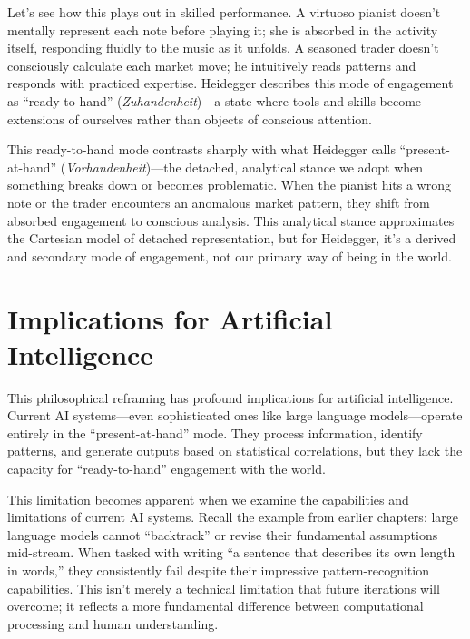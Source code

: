 \documentclass[
  Letterpaper,
]{scrbook}
\begin{document}
Let's see how this plays out in skilled performance. A virtuoso pianist
doesn't mentally represent each note before playing it; she is absorbed
in the activity itself, responding fluidly to the music as it unfolds. A
seasoned trader doesn't consciously calculate each market move; he
intuitively reads patterns and responds with practiced expertise.
Heidegger describes this mode of engagement as
``ready-to-hand''
(\emph{Zuhandenheit})---a state where tools and skills become extensions
of ourselves rather than objects of conscious attention.

This ready-to-hand mode contrasts sharply with what Heidegger calls
``present-at-hand''
(\emph{Vorhandenheit})---the detached, analytical stance we adopt when
something breaks down or becomes problematic. When the pianist hits a
wrong note or the trader encounters an anomalous market pattern, they
shift from absorbed engagement to conscious analysis. This analytical
stance approximates the Cartesian model of detached representation, but
for Heidegger, it's a derived and secondary mode of engagement, not our
primary way of being in the world.

\section{Implications for Artificial
Intelligence}\label{implications-for-artificial-intelligence}

This philosophical reframing has profound implications for artificial
intelligence. Current AI systems---even sophisticated ones like large
language models---operate
entirely in the ``present-at-hand'' mode. They process information,
identify patterns, and generate outputs based on statistical
correlations, but they lack the capacity for ``ready-to-hand''
engagement with the world.

This limitation becomes apparent when we examine the capabilities and
limitations of current AI systems. Recall the example from earlier
chapters: large language models cannot ``backtrack'' or revise their
fundamental assumptions mid-stream. When tasked with writing ``a
sentence that describes its own length in words,'' they consistently
fail despite their impressive pattern-recognition capabilities. This
isn't merely a technical limitation that future iterations will
overcome; it reflects a more fundamental difference between
computational processing and human understanding.
\end{document}
